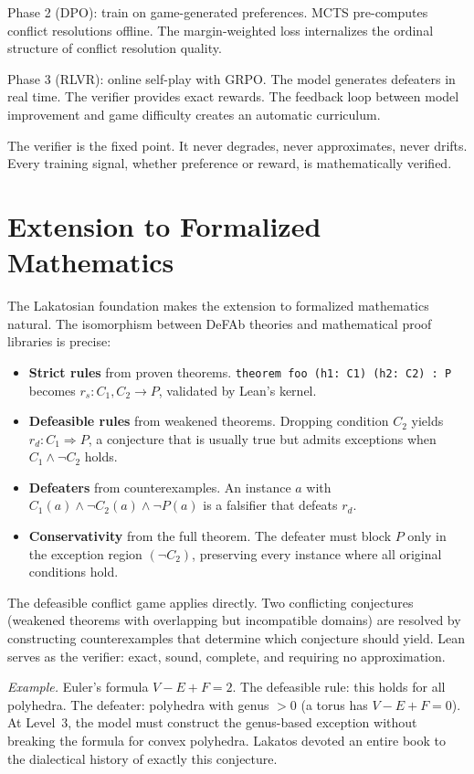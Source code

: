 \documentclass{article}
\newcommand{\defto}{\Rightarrow}
\newcommand{\strictto}{\rightarrow}
\begin{document}
Phase 2 (DPO): train on game-generated preferences. MCTS pre-computes conflict resolutions offline. The margin-weighted loss internalizes the ordinal structure of conflict resolution quality.

Phase 3 (RLVR): online self-play with GRPO. The model generates defeaters in real time. The verifier provides exact rewards. The feedback loop between model improvement and game difficulty creates an automatic curriculum.

The verifier is the fixed point. It never degrades, never approximates, never drifts. Every training signal, whether preference or reward, is mathematically verified.

\section{Extension to Formalized Mathematics}

The Lakatosian foundation makes the extension to formalized mathematics natural. The isomorphism between DeFAb theories and mathematical proof libraries is precise:

\begin{itemize}[nosep]
    \item \textbf{Strict rules} from proven theorems. \texttt{theorem foo (h1: C1) (h2: C2) : P} becomes $r_s\colon C_1, C_2 \strictto P$, validated by Lean's kernel.
    \item \textbf{Defeasible rules} from weakened theorems. Dropping condition $C_2$ yields $r_d\colon C_1 \defto P$, a conjecture that is usually true but admits exceptions when $C_1 \wedge \neg C_2$ holds.
    \item \textbf{Defeaters} from counterexamples. An instance $a$ with $C_1(a) \wedge \neg C_2(a) \wedge \neg P(a)$ is a falsifier that defeats $r_d$.
    \item \textbf{Conservativity} from the full theorem. The defeater must block $P$ only in the exception region $(\neg C_2)$, preserving every instance where all original conditions hold.
\end{itemize}

The defeasible conflict game applies directly. Two conflicting conjectures (weakened theorems with overlapping but incompatible domains) are resolved by constructing counterexamples that determine which conjecture should yield. Lean serves as the verifier: exact, sound, complete, and requiring no approximation.

\textit{Example.} Euler's formula $V - E + F = 2$. The defeasible rule: this holds for all polyhedra. The defeater: polyhedra with genus $> 0$ (a torus has $V - E + F = 0$). At Level~3, the model must construct the genus-based exception without breaking the formula for convex polyhedra. Lakatos devoted an entire book to the dialectical history of exactly this conjecture.
\end{document}
